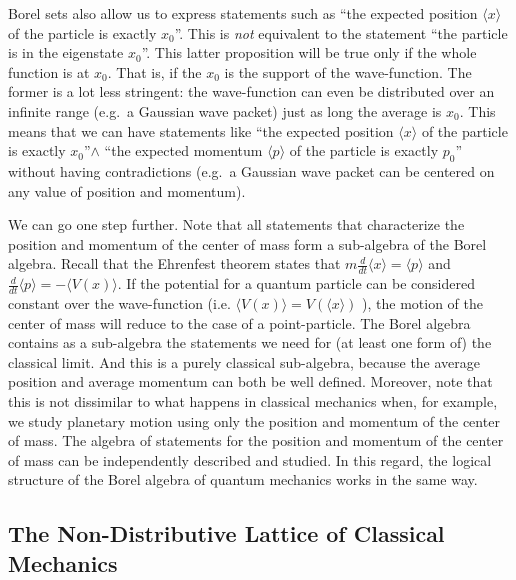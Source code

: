 \documentclass[11pt, executivepaper]{article}
\begin{document}
Borel sets also allow us to express statements such as ``the expected position $\langle x \rangle$ of the particle is exactly $x_0$''. This is \emph{not} equivalent to the statement ``the particle is in the eigenstate $x_0$''. This latter proposition will be true only if the whole function is at $x_0$. That is, if the $x_0$ is the support of the wave-function. The former is a lot less stringent: the wave-function can even be distributed over an infinite range (e.g.\ a Gaussian wave packet) just as long the average is $x_0$. This means that we can have statements like ``the expected position $\langle x \rangle$ of the particle is exactly $x_0$''$\wedge$ ``the expected momentum $\langle p \rangle$ of the particle is exactly $p_0$'' without having contradictions (e.g.\ a Gaussian wave packet can be centered on any value of position and momentum).

We can go one step further. Note that all statements that characterize the position and momentum of the center of mass form a sub-algebra of the Borel algebra. Recall that the Ehrenfest theorem states that $m \frac{d}{dt}\langle x \rangle = \langle p \rangle$ and $ \frac{d}{dt}\langle p \rangle = - \langle V(x) \rangle$. If the potential for a quantum particle can be considered constant over the wave-function (i.e. $\langle V(x) \rangle = V(\langle x \rangle)$ ), the motion of the center of mass will reduce to the case of a point-particle. The Borel algebra contains as a sub-algebra the statements we need for (at least one form of) the classical limit. And this is a purely classical sub-algebra, because the average position and average momentum can both be well defined. Moreover, note that this is not dissimilar to what happens in classical mechanics when, for example, we study planetary motion using only the position and momentum of the center of mass. The algebra of statements for the position and momentum of the center of mass can be independently described and studied. In this regard, the logical structure of the Borel algebra of quantum mechanics works in the same way.

\subsection{The Non-Distributive Lattice of Classical Mechanics}
\end{document}
